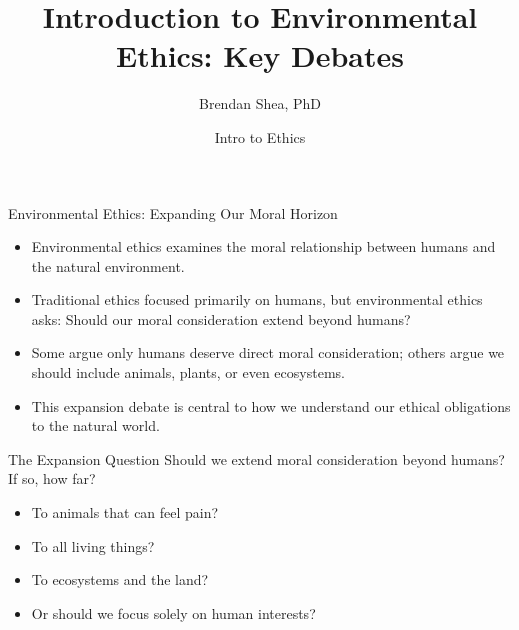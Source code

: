 \documentclass{beamer}
\title{Introduction to Environmental Ethics: Key Debates}
\author{Brendan Shea, PhD}
\date{Intro to Ethics}
\begin{document}
	
	\begin{frame}
		\titlepage
	\end{frame}
	
	\begin{frame}{Environmental Ethics: Expanding Our Moral Horizon}
		\begin{itemize}
			\item Environmental ethics examines the moral relationship between humans and the natural environment.
			\item Traditional ethics focused primarily on humans, but environmental ethics asks: Should our moral consideration extend beyond humans?
			\item Some argue only humans deserve direct moral consideration; others argue we should include animals, plants, or even ecosystems.
			\item This expansion debate is central to how we understand our ethical obligations to the natural world.
		\end{itemize}
		
		\begin{block}{The Expansion Question}
			Should we extend moral consideration beyond humans? If so, how far?
			\begin{itemize}
				\item To animals that can feel pain?
				\item To all living things?
				\item To ecosystems and the land?
				\item Or should we focus solely on human interests?
			\end{itemize}
		\end{block}
	\end{frame}
	
\end{document}
